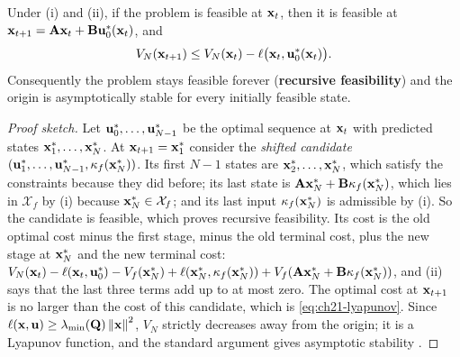 \begin{theorem}
\label{thm:ch21-stability}
Under (i) and (ii), if the problem is feasible at $\mathbf{x}_t$, then it is
feasible at $\mathbf{x}_{t+1}=\mathbf{A}\mathbf{x}_t+\mathbf{B}\mathbf{u}_0^{*}(\mathbf{x}_t)$, and
\begin{equation}
V_N(\mathbf{x}_{t+1})\le V_N(\mathbf{x}_t)-\ell\bigl(\mathbf{x}_t,\mathbf{u}_0^{*}(\mathbf{x}_t)\bigr).
\label{eq:ch21-lyapunov}
\end{equation}
Consequently the problem stays feasible forever (\textbf{recursive
feasibility}) and the origin is asymptotically
stable for every initially feasible state.
\end{theorem}
\begin{proof}[Proof sketch]
Let $\mathbf{u}_0^{*},\dots,\mathbf{u}_{N-1}^{*}$ be the optimal sequence at $\mathbf{x}_t$
with predicted states $\mathbf{x}_1^{*},\dots,\mathbf{x}_N^{*}$. At $\mathbf{x}_{t+1}=\mathbf{x}_1^{*}$
consider the \emph{shifted candidate}
$(\mathbf{u}_1^{*},\dots,\mathbf{u}_{N-1}^{*},\kappa_f(\mathbf{x}_N^{*}))$. Its first $N-1$
states are $\mathbf{x}_2^{*},\dots,\mathbf{x}_N^{*}$, which satisfy the constraints
because they did before; its last state is
$\mathbf{A}\mathbf{x}_N^{*}+\mathbf{B}\kappa_f(\mathbf{x}_N^{*})$, which lies in
$\mathcal{X}_f$ by (i) because $\mathbf{x}_N^{*}\in\mathcal{X}_f$; and its last input
$\kappa_f(\mathbf{x}_N^{*})$ is admissible by (i). So the candidate is feasible,
which proves recursive feasibility. Its cost is the old optimal cost minus the
first stage, minus the old terminal cost, plus the new stage at $\mathbf{x}_N^{*}$
and the new terminal cost:
$V_N(\mathbf{x}_t)-\ell(\mathbf{x}_t,\mathbf{u}_0^{*})-V_f(\mathbf{x}_N^{*})+\ell(\mathbf{x}_N^{*},\kappa_f(\mathbf{x}_N^{*}))+V_f(\mathbf{A}\mathbf{x}_N^{*}+\mathbf{B}\kappa_f(\mathbf{x}_N^{*}))$,
and (ii) says that the last three terms add up to at most zero. The optimal
cost at $\mathbf{x}_{t+1}$ is no larger than the cost of this candidate, which is
\cref{eq:ch21-lyapunov}. Since $\ell(\mathbf{x},\mathbf{u})\ge\lambda_{\min}(\mathbf{Q})\left\lVert \mathbf{x} \right\rVert^2$,
$V_N$ strictly decreases away from the origin; it is a Lyapunov function, and
the standard argument gives asymptotic stability
\cite[Ch.~2]{rawlings2017mpc}. \qedhere
\end{proof}

